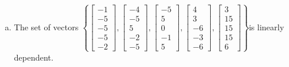 \begin{exerciseAnswer}
\begin{enumerate}[(a)]
\item  The set of vectors \( \left\{ \left[\begin{array}{c}
-1 \\
-5 \\
-5 \\
-5 \\
-2
\end{array}\right] , \left[\begin{array}{c}
-4 \\
-5 \\
5 \\
-2 \\
-5
\end{array}\right] , \left[\begin{array}{c}
-5 \\
5 \\
0 \\
-1 \\
5
\end{array}\right] , \left[\begin{array}{c}
4 \\
3 \\
-6 \\
-3 \\
-6
\end{array}\right] , \left[\begin{array}{c}
3 \\
15 \\
15 \\
15 \\
6
\end{array}\right] \right\} \)is linearly dependent.
\end{enumerate}
    
\end{exerciseAnswer}
    
